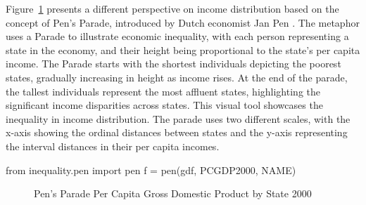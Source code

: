 \documentclass[
  a4paper, 
  twoside,
  final
]{article}
\newenvironment{Shaded}{\begin{snugshade}}{\end{snugshade}}
\newcommand{\ImportTok}[1]{\textcolor[rgb]{0.00,0.46,0.62}{#1}}
\newcommand{\NormalTok}[1]{\textcolor[rgb]{0.00,0.23,0.31}{#1}}
\newcommand{\OperatorTok}[1]{\textcolor[rgb]{0.37,0.37,0.37}{#1}}
\newcommand{\StringTok}[1]{\textcolor[rgb]{0.13,0.47,0.30}{#1}}
\begin{document}
Figure~\ref{fig-pen2000} presents a different perspective on income
distribution based on the concept of Pen's Parade, introduced by Dutch
economist Jan Pen \citep{pen1971IncomeDistribution}. The metaphor uses a
Parade to illustrate economic inequality, with each person representing
a state in the economy, and their height being proportional to the
state's per capita income. The Parade starts with the shortest
individuals depicting the poorest states, gradually increasing in height
as income rises. At the end of the parade, the tallest individuals
represent the most affluent states, highlighting the significant income
disparities across states. This visual tool showcases the inequality in
income distribution. The parade uses two different scales, with the
x-axis showing the ordinal distances between states and the y-axis
representing the interval distances in their per capita incomes.

\begin{Shaded}
\begin{Highlighting}[]
\ImportTok{from}\NormalTok{ inequality.pen }\ImportTok{import}\NormalTok{ pen}
\NormalTok{f }\OperatorTok{=}\NormalTok{ pen(gdf, }\StringTok{\textquotesingle{}PCGDP2000\textquotesingle{}}\NormalTok{, }\StringTok{\textquotesingle{}NAME\textquotesingle{}}\NormalTok{)}
\end{Highlighting}
\end{Shaded}

\begin{figure}[H]


\caption{\label{fig-pen2000}Pen's Parade Per Capita Gross Domestic
Product by State 2000}

\end{figure}%
\end{document}

